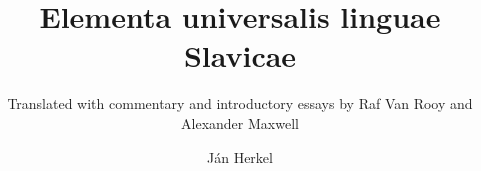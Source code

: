 \author{Ján Herkel}
\title{Elementa universalis linguae Slavicae}
\subtitle{Translated with commentary and introductory essays by Raf Van Rooy and Alexander Maxwell}
\renewcommand{\lsSeries}{hpls}
\renewcommand{\lsSeriesNumber}{}
\lsCoverTitleSizes{42pt}{16mm}%
